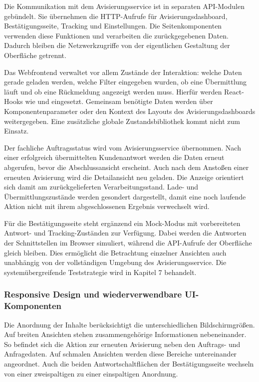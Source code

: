 Die Kommunikation mit dem Avisierungsservice ist in separaten API-Modulen gebündelt. Sie
übernehmen die HTTP-Aufrufe für Avisierungsdashboard, Bestätigungsseite, Tracking und
Einstellungen. Die Seitenkomponenten verwenden diese Funktionen und verarbeiten die
zurückgegebenen Daten. Dadurch bleiben die Netzwerkzugriffe von der eigentlichen Gestaltung der
Oberfläche getrennt.

Das Webfrontend verwaltet vor allem Zustände der Interaktion: welche Daten gerade geladen
werden, welche Filter eingegeben wurden, ob eine Übermittlung läuft und ob eine Rückmeldung
angezeigt werden muss. Hierfür werden React-Hooks wie  und
 eingesetzt. Gemeinsam benötigte Daten werden über Komponentenparameter
oder den Kontext des Layouts des Avisierungsdashboards weitergegeben. Eine zusätzliche globale
Zustandsbibliothek kommt nicht zum Einsatz.

Der fachliche Auftragsstatus wird vom Avisierungsservice übernommen. Nach einer erfolgreich
übermittelten Kundenantwort werden die Daten erneut abgerufen, bevor die Abschlussansicht
erscheint. Auch nach dem Anstoßen einer erneuten Avisierung wird die Detailansicht neu geladen.
Die Anzeige orientiert sich damit am zurückgelieferten Verarbeitungsstand. Lade- und
Übermittlungszustände werden gesondert dargestellt, damit eine noch laufende Aktion nicht mit
ihrem abgeschlossenen Ergebnis verwechselt wird.

Für die Bestätigungsseite steht ergänzend ein Mock-Modus mit vorbereiteten Antwort- und
Tracking-Zuständen zur Verfügung. Dabei werden die Antworten der Schnittstellen im Browser
simuliert, während die API-Aufrufe der Oberfläche gleich bleiben. Dies ermöglicht die
Betrachtung einzelner Ansichten auch unabhängig von der vollständigen Umgebung des
Avisierungsservice. Die systemübergreifende Teststrategie wird in Kapitel 7 behandelt.

\subsubsection{Responsive Design und wiederverwendbare UI-Komponenten}

Die Anordnung der Inhalte berücksichtigt die unterschiedlichen Bildschirmgrößen. Auf breiten
Ansichten stehen zusammengehörige Informationen nebeneinander. So befindet sich die Aktion zur
erneuten Avisierung neben den Auftrags- und Anfragedaten. Auf schmalen Ansichten werden diese
Bereiche untereinander angeordnet. Auch die beiden Antwortschaltflächen der Bestätigungsseite
wechseln von einer zweispaltigen zu einer einspaltigen Anordnung.

